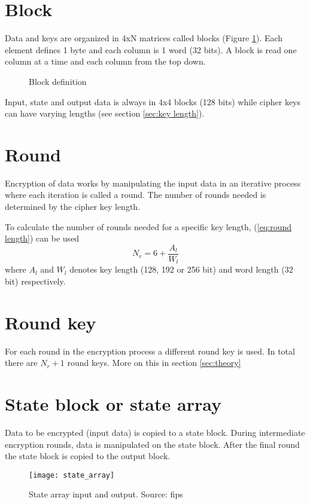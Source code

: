 \documentclass[report.tex]{subfiles}
\begin{document}
\section{Block}
Data and keys are organized in 4xN matrices called blocks (Figure \ref{fig:block definition}). Each element defines 1 byte and each column is 1 word (32 bits). A block is read one column at a time and each column from the top down.

\begin{figure}[h]
\centering
	\caption{Block definition}
	\label{fig:block definition}
\end{figure}

Input, state and output data is always in 4x4 blocks (128 bits) while cipher keys can have varying lengths (see section \ref{sec:key length}).

\section{Round}
Encryption of data works by manipulating the input data in an iterative process where each iteration is called a round. The number of rounds needed is determined by the cipher key length.

To calculate the number of rounds needed for a specific key length, (\ref{eq:round length}) can be used
\begin{equation}\label{eq:round length}
	N_r = 6 + \frac{A_{l}}{W_{l}}
\end{equation}
where $A_l$ and $W_l$ denotes key length (128, 192 or 256 bit) and word length (32 bit) respectively.

\section{Round key}
For each round in the encryption process a different round key is used. In total there are $N_r+1$ round keys. More on this in section \ref{sec:theory}

\section{State block or state array}
Data to be encrypted (input data) is copied to a state block. During intermediate encryption rounds, data is manipulated on the state block. After the final round the state block is copied to the output block.%

\begin{figure}[h]
\centering
\texttt{[image: state\_array]}
\caption{State array input and output. Source: fips}
\label{fig:state array}
\end{figure}
\end{document}
